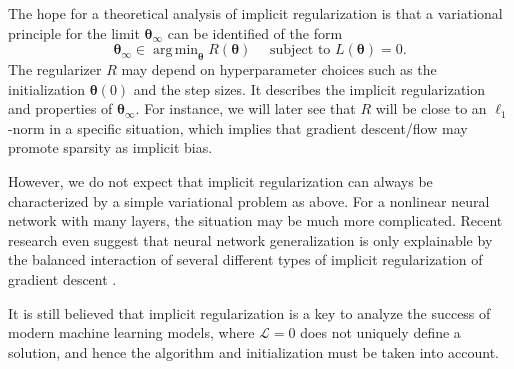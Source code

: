 \documentclass{svproc}
\newcommand{\corr}[1]{#1}
\newcommand{\bx}{\boldsymbol{x}}
\newcommand{\btheta}{{\boldsymbol{\theta}}}
\newcommand{\0}{\boldsymbol{0}}
\newcommand{\1}{\boldsymbol{1}}
\DeclareMathOperator*{\argmin}{arg\,min}
\def\tdisc{{k}}
\begin{document}

The hope for a theoretical analysis of implicit regularization is that a variational principle for the limit $\btheta_\infty$ can be identified of the form
\[
\btheta_\infty \in \argmin_{\btheta} R(\btheta) \quad \mbox{ subject to } L(\btheta) = 0.
\]
The regularizer $R$ may depend on hyperparameter choices such as the initialization $\btheta(0)$ and the step sizes. It describes the implicit regularization and properties of $\btheta_\infty$. For instance, we will later see that $R$ will be close to an $\ell_1$-norm in a specific situation, which implies that gradient descent/flow may promote sparsity as implicit bias.

However, we \corr{do not} expect that implicit regularization can always be characterized by a simple variational problem as above. For a nonlinear neural network with many layers\corr{,} the situation may be much more complicated. Recent research even suggest that neural network generalization is only explainable by the balanced interaction of several different types of implicit regularization of gradient descent \cite{matveev2026conflicting}.

It is still believed that implicit regularization is a key to analyze the success of modern machine learning models, where $\mathcal{L}=0$ does not uniquely define a solution, and hence the algorithm and initialization must be taken into account.


\medskip
\end{document}
